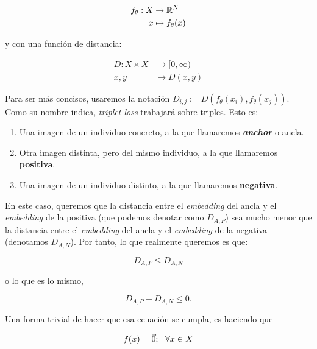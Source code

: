 \begin{equation}
	\begin{split}
		f_{\theta}: X & \to \mathbb{R}^N \\
		x & \mapsto f_{\theta}(x)
	\end{split}
\end{equation}

y con una función de distancia:

\begin{equation}
	\begin{split}
		D: X \times X & \to [0, \infty) \\
		x, y & \mapsto D(x, y)
	\end{split}
\end{equation}

Para ser más concisos, usaremos la notación $D_{i, j} := D(f_{\theta}(x_i), f_{\theta}(x_j))$. Como su nombre indica, \textit{triplet loss} trabajará sobre triples. Esto es:

\begin{enumerate}
	\item Una imagen de un individuo concreto, a la que llamaremos \textbf{\textit{anchor}} o ancla.
	\item Otra imagen distinta, pero del mismo individuo, a la que llamaremos \textbf{positiva}.
	\item Una imagen de un individuo distinto, a la que llamaremos \textbf{negativa}.
\end{enumerate}

En este caso, queremos que la distancia entre el \textit{embedding} del ancla y el \textit{embedding} de la positiva (que podemos denotar como $D_{A, P}$) sea mucho menor que la distancia entre el \textit{embedding} del ancla y el \textit{embedding} de la negativa (denotamos $D_{A, N}$). Por tanto, lo que realmente queremos es que:

\begin{equation}
	D_{A, P} \leq D_{A, N}
\end{equation}

o lo que es lo mismo,

\begin{equation}
	D_{A, P} - D_{A, N} \leq 0.
\end{equation}

Una forma trivial de hacer que esa ecuación se cumpla, es haciendo que

\begin{equation}
	f(x) = \vec{0}; \ \  \forall x \in X
\end{equation}

